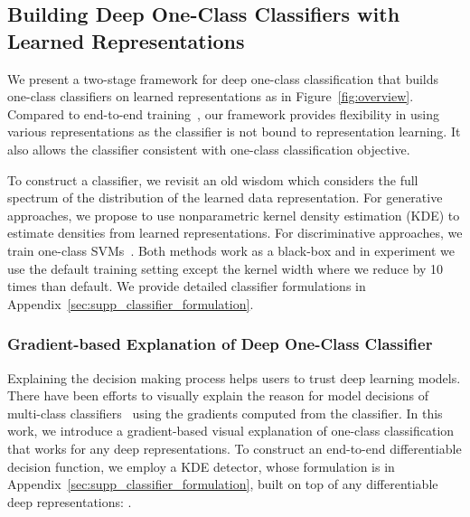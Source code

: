 \documentclass{article} \usepackage{iclr2021_conference,times}
\begin{document}
\subsection{Building Deep One-Class Classifiers with Learned Representations}
\label{sec:framework}
\vspace{-0.05in}
We present a two-stage framework for deep one-class classification that builds one-class classifiers on learned representations as in Figure~\ref{fig:overview}.
Compared to end-to-end training~\citep{ruff2018deep,golan2018deep,hendrycks2019using,bergman2020classification}, our framework provides flexibility in using various representations as the classifier is not bound to representation learning. 
It also allows the classifier consistent with one-class classification objective.

To construct a classifier, we revisit an old wisdom which considers the full spectrum of the distribution of the learned data representation. For generative approaches, we propose to use nonparametric kernel density estimation (KDE) to estimate densities from learned representations. For discriminative approaches, we train one-class SVMs~\citep{scholkopf2000support}. Both methods work as a black-box and in experiment we use the default training setting except the kernel width where we reduce by 10 times than default. We provide detailed classifier formulations in Appendix~\ref{sec:supp_classifier_formulation}.

















\subsubsection{Gradient-based Explanation of Deep One-Class Classifier}
\label{sec:framework_explanation}
\vspace{-0.05in}
Explaining the decision making process helps users to trust deep learning models. There have been efforts to visually explain the reason for model decisions of multi-class classifiers~\citep{zeiler2014visualizing,bach2015pixel,zhou2016learning,selvaraju2017grad,sundararajan2017axiomatic,adebayo2018sanity,kapishnikov2019xrai} using the gradients computed from the classifier.
In this work, we introduce a gradient-based visual explanation of one-class classification that works for any deep representations. To construct an end-to-end differentiable decision function, we employ a KDE detector, whose formulation is in Appendix~\ref{sec:supp_classifier_formulation}, built on top of any differentiable deep representations:
.
\end{document}
